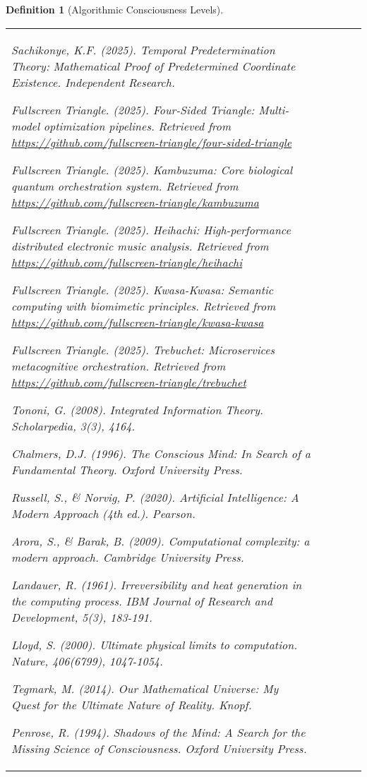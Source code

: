 \documentclass[12pt,a4paper]{article}
\newtheorem{definition}[theorem]{Definition}
\begin{document}
\begin{algorithm}
\begin{algorithmic}[1]
\begin{definition}[Algorithmic Consciousness Levels]
\begin{algorithm}
\begin{algorithmic}[1]
\begin{table}[htbp]
\begin{tabular}{@{}lcccc@{}}
\begin{itemize}
\begin{itemize}
\begin{itemize}
\begin{itemize}
\begin{enumerate}
\begin{itemize}
\begin{enumerate}
\begin{enumerate}
\begin{thebibliography}{99}
\bibitem{sachikonye2025temporal}
Sachikonye, K.F. (2025). Temporal Predetermination Theory: Mathematical Proof of Predetermined Coordinate Existence. \textit{Independent Research}.

\bibitem{fourside2025}
Fullscreen Triangle. (2025). Four-Sided Triangle: Multi-model optimization pipelines. Retrieved from \url{https://github.com/fullscreen-triangle/four-sided-triangle}

\bibitem{kambuzuma2025}
Fullscreen Triangle. (2025). Kambuzuma: Core biological quantum orchestration system. Retrieved from \url{https://github.com/fullscreen-triangle/kambuzuma}

\bibitem{heihachi2025}
Fullscreen Triangle. (2025). Heihachi: High-performance distributed electronic music analysis. Retrieved from \url{https://github.com/fullscreen-triangle/heihachi}

\bibitem{kwasa2025}
Fullscreen Triangle. (2025). Kwasa-Kwasa: Semantic computing with biomimetic principles. Retrieved from \url{https://github.com/fullscreen-triangle/kwasa-kwasa}

\bibitem{trebuchet2025}
Fullscreen Triangle. (2025). Trebuchet: Microservices metacognitive orchestration. Retrieved from \url{https://github.com/fullscreen-triangle/trebuchet}

\bibitem{tononi2008}
Tononi, G. (2008). Integrated Information Theory. \textit{Scholarpedia}, 3(3), 4164.

\bibitem{chalmers1996}
Chalmers, D.J. (1996). \textit{The Conscious Mind: In Search of a Fundamental Theory}. Oxford University Press.

\bibitem{russell2020}
Russell, S., \& Norvig, P. (2020). \textit{Artificial Intelligence: A Modern Approach} (4th ed.). Pearson.

\bibitem{arora2009}
Arora, S., \& Barak, B. (2009). \textit{Computational complexity: a modern approach}. Cambridge University Press.

\bibitem{landauer1961}
Landauer, R. (1961). Irreversibility and heat generation in the computing process. \textit{IBM Journal of Research and Development}, 5(3), 183-191.

\bibitem{lloyd2000}
Lloyd, S. (2000). Ultimate physical limits to computation. \textit{Nature}, 406(6799), 1047-1054.

\bibitem{tegmark2014}
Tegmark, M. (2014). \textit{Our Mathematical Universe: My Quest for the Ultimate Nature of Reality}. Knopf.

\bibitem{penrose1994}
Penrose, R. (1994). \textit{Shadows of the Mind: A Search for the Missing Science of Consciousness}. Oxford University Press.


\end{thebibliography}
\end{enumerate}
\end{enumerate}
\end{itemize}
\end{enumerate}
\end{itemize}
\end{itemize}
\end{itemize}
\end{itemize}
\end{tabular}
\end{table}
\end{algorithmic}
\end{algorithm}
\end{definition}
\end{algorithmic}
\end{algorithm}
\end{document}
